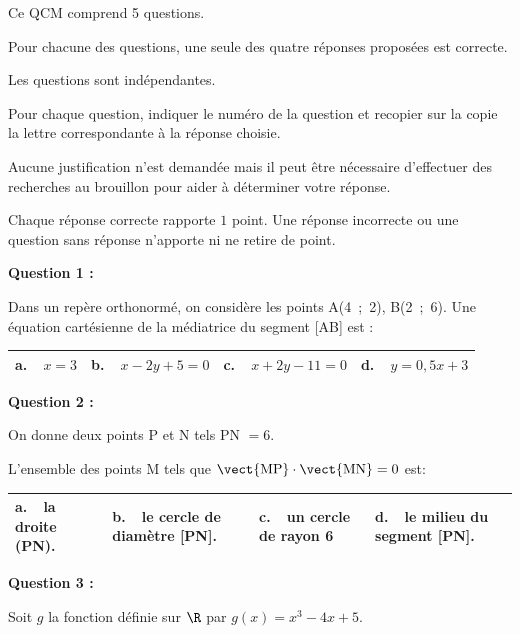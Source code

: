 \medskip

Ce QCM comprend 5 questions.

Pour chacune des questions, une seule des quatre réponses proposées est correcte.

Les questions sont indépendantes.

Pour chaque question, indiquer le numéro de la question et recopier sur la copie la lettre correspondante à la réponse choisie.

Aucune justification n'est demandée mais il peut être nécessaire d'effectuer des recherches au brouillon pour aider à déterminer votre réponse.

Chaque réponse correcte rapporte $1$ point. Une réponse incorrecte ou une question sans réponse n'apporte ni ne retire de point.

\medskip

\textbf{Question 1 :}

\medskip

Dans un repère orthonormé, on considère les points A(4~;~2), B(2~;~6). Une équation cartésienne de la médiatrice du segment [AB] est :

\begin{center}
\begin{tabularx}{\linewidth}{|*{4}{X|}}\hline
\textbf{a.~~}$x = 3$&\textbf{b.~~}$x - 2y + 5 = 0$&\textbf{c.~~}$x + 2y - 11  = 0$&\textbf{d.~~}$y = 0,5x + 3$\\ \hline
\end{tabularx}
\end{center}

\medskip

\textbf{Question 2 :}

\medskip

On donne deux points P et N tels PN $= 6$.

L'ensemble des points M tels que $\vect{\text{MP}} \cdot \vect{\text{MN}} = 0$ est:

\begin{center}
\begin{tabularx}{\linewidth}{|*{4}{X|}}\hline
\textbf{a.~~}la droite (PN).&\textbf{b.~~}le cercle de diamètre [PN].&\textbf{c.~~}un cercle de rayon 6&\textbf{d.~~}le milieu du segment [PN].\\ \hline
\end{tabularx}
\end{center}

\medskip

\textbf{Question 3 :}

\medskip
Soit $g$ la fonction définie sur $\R$ par $g(x) = x^3 - 4x + 5$.

